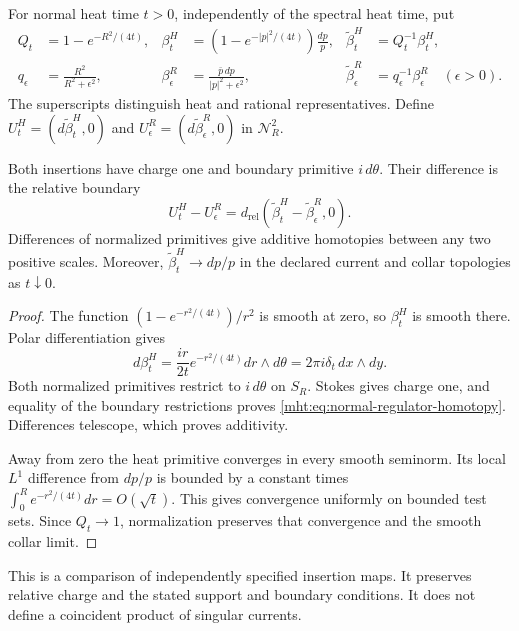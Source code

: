 For normal heat time $t>0$, independently of the spectral heat time,
put
\begin{align*}
 Q_t&=1-e^{-R^2/(4t)},&
 \beta_t^H&=(1-e^{-|p|^2/(4t)})\frac{dp}{p},&
 \widetilde\beta_t^H&=Q_t^{-1}\beta_t^H,\\
 q_\epsilon&=\frac{R^2}{R^2+\epsilon^2},&
 \beta_\epsilon^R&=\frac{\bar p\,dp}{|p|^2+\epsilon^2},&
 \widetilde\beta_\epsilon^R&=q_\epsilon^{-1}\beta_\epsilon^R
       \quad(\epsilon>0).
\end{align*}
The superscripts distinguish heat and rational representatives.
Define $U_t^H=(d\widetilde\beta_t^H,0)$ and
$U_\epsilon^R=(d\widetilde\beta_\epsilon^R,0)$ in $\mathcal N_R^2$.

\begin{proposition}\label{mht:prop:relative-normal-insertion}
Both insertions have charge one and boundary primitive $i\,d\theta$.
Their difference is the relative boundary
\begin{equation}\label{mht:eq:normal-regulator-homotopy}
 U_t^H-U_\epsilon^R
   =d_{\mathrm{rel}}
        (\widetilde\beta_t^H-\widetilde\beta_\epsilon^R,0).
\end{equation}
Differences of normalized primitives give additive homotopies between
any two positive scales. Moreover,
$\widetilde\beta_t^H\to dp/p$ in the declared current and collar
topologies as $t\downarrow0$.
\end{proposition}

\begin{proof}
The function $(1-e^{-r^2/(4t)})/r^2$ is smooth at zero, so
$\beta_t^H$ is smooth there. Polar differentiation gives
\[
 d\beta_t^H=\frac{ir}{2t}e^{-r^2/(4t)}dr\wedge d\theta
          =2\pi i\delta_t\,dx\wedge dy.
\]
Both normalized primitives restrict to $i\,d\theta$ on $S_R$.
Stokes gives charge one, and equality of the boundary restrictions
proves \eqref{mht:eq:normal-regulator-homotopy}. Differences telescope,
which proves additivity.

Away from zero the heat primitive converges in every smooth seminorm.
Its local $L^1$ difference from $dp/p$ is bounded by a constant times
$\int_0^R e^{-r^2/(4t)}dr=O(\sqrt t)$.
This gives convergence uniformly on bounded test sets.
Since $Q_t\to1$, normalization preserves that convergence and the
smooth collar limit.
\end{proof}

This is a comparison of independently specified insertion maps.
It preserves relative charge and the stated support and boundary
conditions. It does not define a coincident product of singular currents.

